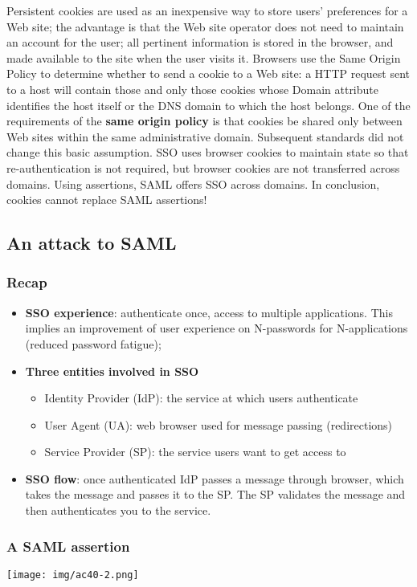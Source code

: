 \documentclass[a4paper, 10pt, titlepage]{article}
\begin{document}
Persistent cookies are used as an inexpensive way to store users’ preferences for a Web site; the advantage is that the Web site operator does not need to maintain an account for the user; all pertinent information is stored in the browser, and made available to the site when the user visits it. Browsers use the Same Origin Policy to determine whether to send a cookie to a Web site: a HTTP request sent to a host will contain those and only those cookies whose Domain attribute identifies the host itself or the DNS domain to which the host belongs. One of the requirements of the \textbf{same origin policy} is that cookies be shared only between Web sites within the same administrative domain. Subsequent standards did not change this basic assumption. SSO uses browser cookies to maintain state so that re-authentication is not required, but browser cookies are not transferred across domains. Using assertions, SAML offers SSO across domains. In conclusion, cookies cannot replace SAML assertions!

\subsection{An attack to SAML}
\subsubsection*{Recap}
\begin{itemize}
\item \textbf{SSO experience}: authenticate once, access to multiple applications. This implies an improvement of user experience on N-passwords for N-applications (reduced password fatigue);
\item \textbf{Three entities involved in SSO}
	\begin{itemize}
	\item Identity Provider (IdP): the service at which users authenticate
	\item User Agent (UA): web browser used for message passing (redirections)
	\item Service Provider (SP): the service users want to get access to
	\end{itemize}
\item \textbf{SSO flow}: once authenticated IdP passes a message through browser, which takes the message and passes it to the SP. The SP validates the message and then authenticates you to the service.
\end{itemize}

\subsubsection*{A SAML assertion}
\texttt{[image: img/ac40-2.png]}
\end{document}
